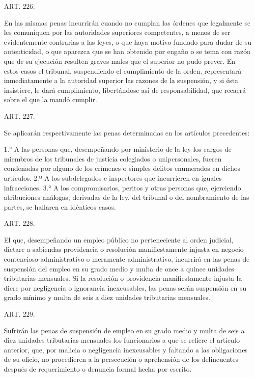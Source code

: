     ART. 226.

    En las mismas penas incurrirán cuando no cumplan las órdenes que legalmente se les comuniquen por las autoridades superiores competentes, a menos de ser evidentemente contrarias a las leyes, o que haya motivo fundado para dudar de su autenticidad, o que aparezca que se han obtenido por engaño o se tema con razón que de su ejecución resulten graves males que el superior no pudo prever.
    En estos casos el tribunal, suspendiendo el cumplimiento de la orden, representará inmediatamente a la autoridad superior las razones de la suspensión, y si ésta insistiere, le dará cumplimiento, libertándose así de responsabilidad, que recaerá sobre el que la mandó cumplir.


    ART. 227.

    Se aplicarán respectivamente las penas determinadas en los artículos precedentes:

    1.° A las personas que, desempeñando por ministerio de la ley los cargos de miembros de los tribunales de justicia colegiados o unipersonales, fueren condenadas por alguno de los crímenes o simples delitos enumerados en dichos artículos.
    2.º A los subdelegados e inspectores que incurrieren en iguales infracciones.
    3.° A los compromisarios, peritos y otras personas que, ejerciendo atribuciones análogas, derivadas de la ley, del tribunal o del nombramiento de las partes, se hallaren en idénticos casos.

    ART. 228.

    El que, desempeñando un empleo público no perteneciente al orden judicial, dictare a sabiendas providencia o resolución manifiestamente injusta en negocio contencioso-administrativo o meramente administrativo, incurrirá en las penas de suspensión del empleo en su grado medio y multa de once a quince unidades tributarias mensuales.
    Si la resolución o providencia manifiestamente injusta la diere por negligencia o ignorancia inexcusables, las penas serán suspensión en su grado mínimo y multa de seis a diez unidades tributarias mensuales.





    ART. 229.

    Sufrirán las penas de suspensión de empleo en su grado medio y multa de seis a diez unidades tributarias mensuales los funcionarios a que se refiere el artículo anterior, que, por malicia o negligencia inexcusables y faltando a las obligaciones de su oficio, no procedieren a la persecución o aprehensión de los delincuentes después de requerimiento o denuncia formal hecha por escrito.





